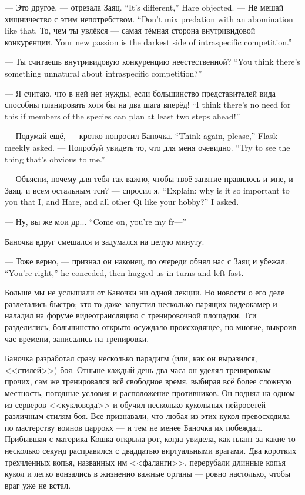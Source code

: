 {--- Это другое, --- отрезала Заяц.}
{``It's different,'' Hare objected.}
{--- Не мешай хищничество с этим непотребством.}
{``Don't mix predation with an abomination like that.}
{То, чем ты увлёкся --- самая тёмная сторона внутривидовой конкуренции.}
{Your new passion is the darkest side of intraspecific competition.''}

{--- Ты считаешь внутривидовую конкуренцию неестественной?}
{``You think there's something unnatural about intraspecific competition?''}

{--- Я считаю, что в ней нет нужды, если большинство представителей вида способны планировать хотя бы на два шага вперёд!}
{``I think there's no need for this if members of the species can plan at least two steps ahead!''}

{--- Подумай ещё, --- кротко попросил Баночка.}
{``Think again, please,'' Flask meekly asked.}
{--- Попробуй увидеть то, что для меня очевидно.}
{``Try to see the thing that's obvious to me.''}

{--- Объясни, почему для тебя так важно, чтобы твоё занятие нравилось и мне, и Заяц, и всем остальным тси? --- спросил я.}
{``Explain: why is it so important to you that I, and Hare, and all other Qi like your hobby?'' I asked.}

{--- Ну, вы же мои др...}
{``Come on, you're my fr---''}

Баночка вдруг смешался и задумался на целую минуту.

{--- Тоже верно, --- признал он наконец, по очереди обнял нас с Заяц и убежал.}
{``You're right,'' he conceded, then hugged us in turns and left fast.}

Больше мы не услышали от Баночки ни одной лекции.
Но новости о его деле разлетались быстро;
кто-то даже запустил несколько парящих видеокамер и наладил на форуме видеотрансляцию с тренировочной площадки.
Тси разделились;
большинство открыто осуждало происходящее, но многие, выкроив час времени, записались на тренировки.

Баночка разработал сразу несколько парадигм (или, как он выразился, <<стилей>>) боя.
Отныне каждый день два часа он уделял тренировкам прочих, сам же тренировался всё свободное время, выбирая всё более сложную местность, погодные условия и расположение противников.
Он поднял на одном из серверов <<кукловода>> и обучил несколько кукольных нейросетей различным стилям боя.
Все признавали, что любая из этих кукол превосходила по мастерству воинов царрокх --- и тем не менее Баночка их побеждал.
Прибывшая с материка Кошка открыла рот, когда увидела, как плант за какие-то несколько секунд расправился с двадцатью виртуальными врагами.
Два коротких трёхчленных копья, названных им <<фаланги>>, перерубали длинные копья кукол и легко вонзались в жизненно важные органы --- ровно настолько, чтобы враг уже не встал.

